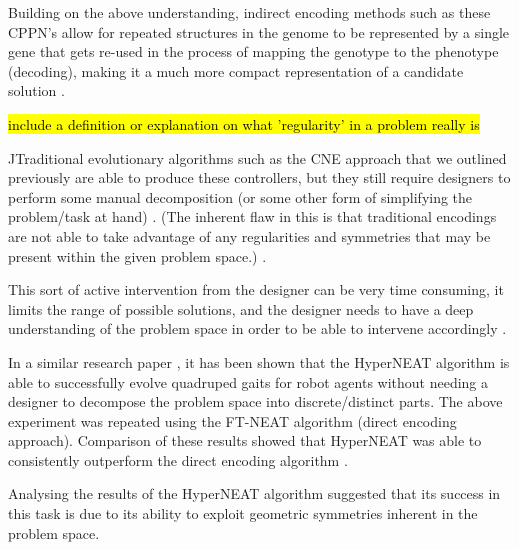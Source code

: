Building on the above understanding, indirect encoding methods such as these CPPN's allow for repeated structures in the genome to be represented by a single gene that gets re-used in the process of mapping the genotype to the phenotype (decoding), making it a much more compact representation of a candidate solution \cite{stanley2009hypercube}.

\hl{include a definition or explanation on what 'regularity' in a problem really is}

^^
Traditional evolutionary algorithms such as the CNE approach that we outlined previously are able to produce these controllers, but they still require designers to perform some manual decomposition (or some other form of simplifying the problem/task at hand) \cite{clune2009evolving}.
(The inherent flaw in this is that traditional encodings are not able to take advantage of any regularities and symmetries that may be present within the given problem space.) \cite{clune2009evolving}.


This sort of active intervention from the designer can be very time consuming, it limits the range of possible solutions, and the designer needs to have a deep understanding of the problem space in order to be able to intervene accordingly \cite{clune2009evolving}.

In a similar research paper \cite{clune2009evolving}, it has been shown that the HyperNEAT algorithm is able to successfully evolve quadruped gaits for robot agents without needing a designer to decompose the problem space into discrete/distinct parts.
The above experiment was repeated using the FT-NEAT algorithm (direct encoding approach). Comparison of these results showed that HyperNEAT was able to consistently outperform the direct encoding algorithm \cite{clune2009evolving}.

Analysing the results of the HyperNEAT algorithm suggested that its success in this task is due to its ability to exploit geometric symmetries inherent in the problem space.






